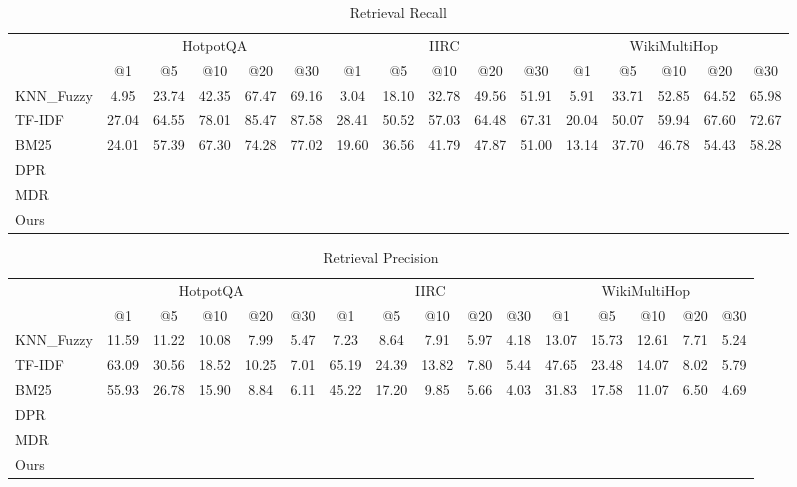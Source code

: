 \begin{table}[]
\scriptsize
\centering
\begin{tabular}{lccccc|ccccc|ccccc}
\hline
\multirow{2}{*}{} & \multicolumn{5}{c|}{HotpotQA} & \multicolumn{5}{c|}{IIRC} & \multicolumn{5}{c}{WikiMultiHop} \\
 & @1 & @5 & @10 & @20 & @30 & @1 & @5 & @10 & @20 & @30 & @1 & @5 & @10 & @20 & @30 \\
\hline
KNN\_Fuzzy & 4.95 & 23.74 & 42.35 & 67.47 & 69.16 & 3.04 & 18.10 & 32.78 & 49.56 & 51.91 & 5.91 & 33.71 & 52.85 & 64.52 & 65.98 \\
TF-IDF & 27.04 & 64.55 & 78.01 & 85.47 & 87.58 & 28.41 & 50.52 & 57.03 & 64.48 & 67.31 & 20.04 & 50.07 & 59.94 & 67.60 & 72.67 \\
BM25 & 24.01 & 57.39 & 67.30 & 74.28 & 77.02 & 19.60 & 36.56 & 41.79 & 47.87 & 51.00 & 13.14 & 37.70 & 46.78 & 54.43 & 58.28 \\
DPR &  &  &  &  &  &  &  &  &  &  &  &  &  &  &  \\
MDR &  &  &  &  &  &  &  &  &  &  &  &  &  &  &  \\
Ours &  &  &  &  &  &  &  &  &  &  &  &  &  &  &  \\
\hline
\end{tabular}
\caption{Retrieval Recall}
\end{table}


\begin{table}[]
\scriptsize
\centering
\begin{tabular}{lccccc|ccccc|ccccc}
\hline
\multirow{2}{*}{} & \multicolumn{5}{c|}{HotpotQA} & \multicolumn{5}{c|}{IIRC} & \multicolumn{5}{c}{WikiMultiHop} \\
 & @1 & @5 & @10 & @20 & @30 & @1 & @5 & @10 & @20 & @30 & @1 & @5 & @10 & @20 & @30 \\
\hline
KNN\_Fuzzy & 11.59 & 11.22 & 10.08 & 7.99 & 5.47 & 7.23 & 8.64 & 7.91 & 5.97 & 4.18 & 13.07 & 15.73 & 12.61 & 7.71 & 5.24 \\
TF-IDF & 63.09 & 30.56 & 18.52 & 10.25 & 7.01 & 65.19 & 24.39 & 13.82 & 7.80 & 5.44 & 47.65 & 23.48 & 14.07 & 8.02 & 5.79 \\
BM25 & 55.93 & 26.78 & 15.90 & 8.84 & 6.11 & 45.22 & 17.20 & 9.85 & 5.66 & 4.03 & 31.83 & 17.58 & 11.07 & 6.50 & 4.69 \\
DPR &  &  &  &  &  &  &  &  &  &  &  &  &  &  &  \\
MDR &  &  &  &  &  &  &  &  &  &  &  &  &  &  &  \\
Ours &  &  &  &  &  &  &  &  &  &  &  &  &  &  &  \\
\hline
\end{tabular}
\caption{Retrieval Precision}
\end{table}


